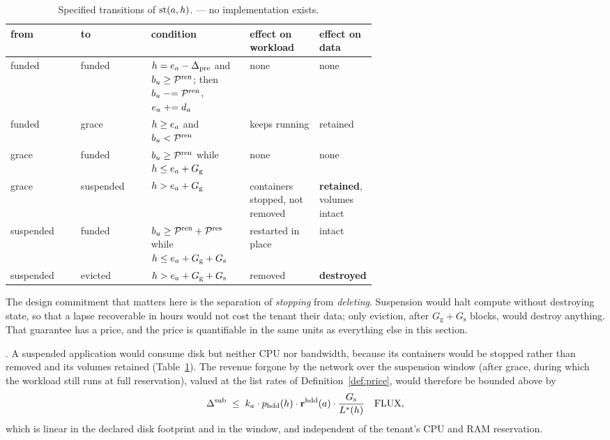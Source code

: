 \begin{table}[H]
\centering\small
\caption{Specified transitions of $\mathrm{st}(a,h)$. \planned --- no implementation exists.}
\label{tab:transitions}
\begin{tabular}{@{}llp{0.27\linewidth}p{0.19\linewidth}p{0.15\linewidth}@{}}
\toprule
from & to & condition & effect on workload & effect on data \\
\midrule
\textsf{funded} & \textsf{funded} &
$h = e_{a} - \Delta_{\mathrm{pre}}$ and $b_u \ge \mathcal{P}^{\mathrm{ren}}$; then
$b_u \mathrel{-}= \mathcal{P}^{\mathrm{ren}}$, $e_{a} \mathrel{+}= d_{a}$ &
none & none \\
\textsf{funded} & \textsf{grace} &
$h \ge e_{a}$ and $b_u < \mathcal{P}^{\mathrm{ren}}$ &
keeps running & retained \\
\textsf{grace} & \textsf{funded} &
$b_u \ge \mathcal{P}^{\mathrm{ren}}$ while $h \le e_{a} + G_{\mathrm{g}}$ &
none & none \\
\textsf{grace} & \textsf{suspended} &
$h > e_{a} + G_{\mathrm{g}}$ &
containers stopped, not removed & \textbf{retained}, volumes intact \\
\textsf{suspended} & \textsf{funded} &
$b_u \ge \mathcal{P}^{\mathrm{ren}} + \mathcal{P}^{\mathrm{res}}$ while
$h \le e_{a} + G_{\mathrm{g}} + G_{\mathrm{s}}$ &
restarted in place & intact \\
\textsf{suspended} & \textsf{evicted} &
$h > e_{a} + G_{\mathrm{g}} + G_{\mathrm{s}}$ &
removed & \textbf{destroyed} \\
\bottomrule
\end{tabular}
\end{table}

The design commitment that matters here is the separation of \emph{stopping} from \emph{deleting}.
Suspension would halt compute without destroying state, so that a lapse recoverable in hours would
not cost the tenant their data; only eviction, after $G_{\mathrm{g}} + G_{\mathrm{s}}$ blocks, would
destroy anything. That guarantee has a price, and the price is quantifiable in the same units as
everything else in this section.

\begin{property}
\label{prop:subsidy}
\planned. A suspended application would consume disk but neither CPU nor bandwidth, because its
containers would be stopped rather than removed and its volumes retained
(Table~\ref{tab:transitions}). The revenue forgone by the network over the suspension window
(after grace, during which the workload still runs at full reservation),
valued at the list rates of Definition~\ref{def:price}, would therefore be bounded above by
\[
\Delta^{\mathrm{sub}} \;\le\; k_{a} \cdot p_{\mathrm{hdd}}(h) \cdot
\mathbf{r}^{\mathrm{hdd}}(a) \cdot \frac{G_{\mathrm{s}}}{L^{\ast}(h)}
\quad \text{FLUX},
\]
which is linear in the declared disk footprint and in the window, and independent of the tenant's CPU
and RAM reservation.
\end{property}

